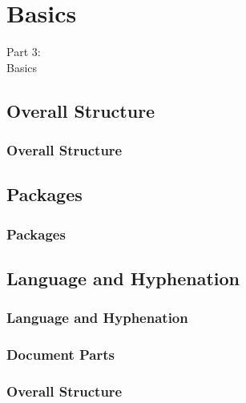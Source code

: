 {
\renewcommand{\bgcolor}{basics}

\section{Basics}
\begin{frame}
  \vspace{25mm}
  \begin{center}
    \Huge{Part 3:\\Basics}
  \end{center}
\end{frame}

\subsection{Overall Structure}
\begin{frame}[fragile]
  \frametitle{Overall Structure}
  \vspace{3mm}
  
\end{frame}

\subsection{Packages}
\begin{frame}[fragile]
  \frametitle{Packages}
  \vspace{3mm}
  
\end{frame}

\subsection{Language and Hyphenation}
\begin{frame}[fragile]
  \frametitle{Language and Hyphenation}
  \vspace{3mm}
  
\end{frame}

\subsubsection{Document Parts}
\begin{frame}[fragile]
  \frametitle{Overall Structure }
  \vspace{3mm}
  
\end{frame}

}
